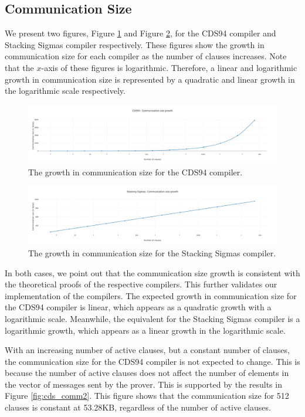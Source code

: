 \subsection{Communication Size}\label{eval:comm}
We present two figures, Figure \ref{fig:cds_comm} and Figure \ref{fig:stacksig_comm},
for the CDS94 compiler and Stacking Sigmas compiler respectively. These figures 
show the growth in communication size for each compiler as the number of clauses
increases. Note that the $x$-axis of these figures is logarithmic. Therefore, a 
linear and logarithmic growth in communication size is represented by a quadratic and linear growth in the logarithmic scale respectively. 
\begin{figure}[h]
  \centering
  \includegraphics[width=\linewidth]{../assets/plots/cds_commsize.png}
  \caption{The growth in communication size for the CDS94 compiler. }
  \label{fig:cds_comm}  
\end{figure}

\begin{figure}[h]
  \centering
  \includegraphics[width=\linewidth]{../assets/plots/ss_commsize.png}
  \caption{The growth in communication size for the Stacking Sigmas compiler. }
  \label{fig:stacksig_comm}
\end{figure}

In both cases, we point out that the communication size growth is consistent with 
the theoretical proofs of the respective compilers. This further validates our
implementation of the compilers. The expected growth in communication size for
the CDS94 compiler is linear, which appears as a quadratic growth with a 
logarithmic scale. Meanwhile, the equivalent for the Stacking Sigmas compiler is
a logarithmic growth, which appears as a linear growth in the logarithmic scale. 

With an increasing number of active clauses, but a constant number of clauses, 
the communication size for the CDS94 compiler is not expected to change. This is
because the number of active clauses does not affect the number of elements in the 
vector of messages sent by the prover. This is supported by the results in Figure
\ref{fig:cds_comm2}. This figure shows that the communication size for 512 
clauses is constant at 53.28KB, regardless of the number of active clauses.

